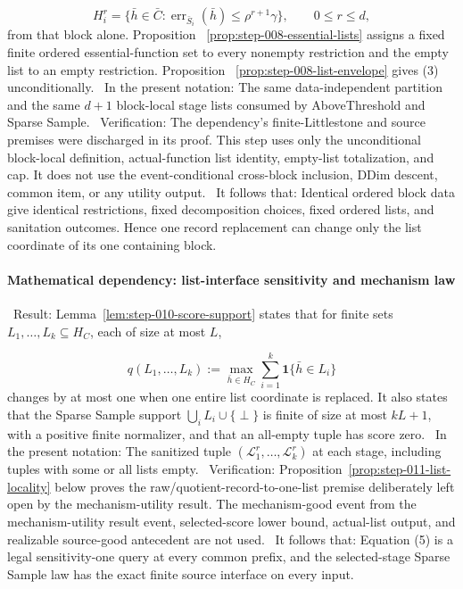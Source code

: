   \[
    H_i^r
    =\{\bar h\in\bar C:
       \operatorname{err}_{\bar S_i}(\bar h)
       \leq \rho^{r+1}\gamma\},
    \qquad 0\leq r\leq d,
    \tag{4}
  \]
  from that block alone. Proposition
  ~\ref{prop:step-008-essential-lists} assigns a fixed finite ordered
  essential-function set to every nonempty restriction and the empty list to
  an empty restriction. Proposition
  ~\ref{prop:step-008-list-envelope} gives (3) unconditionally.
\noindent\textbullet\ In the present notation: The same data-independent partition and the same
  \(d+1\) block-local stage lists consumed by AboveThreshold and Sparse
  Sample.
\noindent\textbullet\ Verification: The dependency's finite-Littlestone and source
  premises were discharged in its  proof. This step uses only the
  unconditional block-local definition, actual-function list identity,
  empty-list totalization, and cap. It does not use the event-conditional
  cross-block inclusion, DDim descent, common item, or any utility output.
\noindent\textbullet\ It follows that: Identical ordered block data give identical restrictions,
  fixed decomposition choices, fixed ordered lists, and sanitation outcomes.
  Hence one record replacement can change only the list coordinate of its
  one containing block.

\paragraph{Mathematical dependency: list-interface sensitivity and mechanism law}

\noindent\textbullet\ Result: Lemma~\ref{lem:step-010-score-support} states
  that for finite sets \(L_1,\ldots,L_k\subseteq H_C\), each of size at most
  \(L\),

  \[
    q(L_1,\ldots,L_k)
    :=\max_{\bar h\in H_C}
      \sum_{i=1}^k\mathbf 1\{\bar h\in L_i\}
    \tag{5}
  \]
  changes by at most one when one entire list coordinate is replaced. It
  also states that the Sparse Sample support
  \(\bigcup_iL_i\cup\{\perp\}\) is finite of size at most \(kL+1\), with
  a positive finite normalizer, and that an all-empty tuple has score zero.
\noindent\textbullet\ In the present notation: The sanitized tuple
  \((\mathcal L_1^r,\ldots,\mathcal L_k^r)\) at each stage, including tuples
  with some or all lists empty.
\noindent\textbullet\ Verification: Proposition~\ref{prop:step-011-list-locality} below
  proves the raw/quotient-record-to-one-list premise deliberately left open
  by the mechanism-utility result. The mechanism-good event from the mechanism-utility result
  event, selected-score lower bound, actual-list output, and realizable
  source-good antecedent are not used.
\noindent\textbullet\ It follows that: Equation (5) is a legal sensitivity-one query at every
  common prefix, and the selected-stage Sparse Sample law has the exact
  finite source interface on every input.

